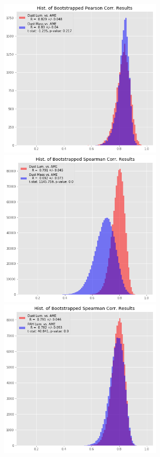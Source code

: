 \documentclass[preprint2,longabstract]{aastex}
\begin{document}
\begin{figure}
\label{fig:AME_boostrap_lum_regs_pr2}
\includegraphics[width=80mm]{../Plots/AMEregs_bootstrap_DmassDlum_PCXV.png}
\includegraphics[width=80mm]{../Plots/AMEregs_bootstrap_DmassDlum_spearman_PCXV.png}
\includegraphics[width=80mm]{../Plots/AMEregs_bootstrap_PmassDlum_spearman_PR2.png}

\end{figure}
\end{document}
